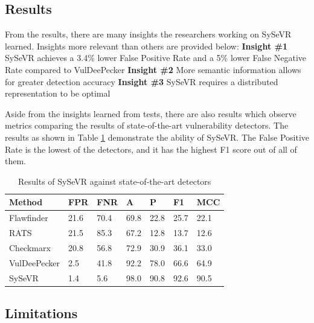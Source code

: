 \documentclass[12pt,twocolumn,letterpaper]{article}
\begin{document}
\subsection{Results}
\label{sub:results}
From the results, there are many insights the researchers working on SySeVR learned. Insights more relevant than others are
provided below:
\linebreak
\textbf{Insight \#1} SySeVR achieves a 3.4\% lower False Positive Rate and a 5\% lower False Negative Rate compared to VulDeePecker
\linebreak
\textbf{Insight \#2} More semantic information allows for greater detection accuracy
\linebreak
\textbf{Insight \#3} SySeVR requires a distributed representation to be optimal

Aside from the insights learned from tests, there are also results which observe metrics comparing the results 
of state-of-the-art vulnerability detectors. The results as shown in Table \ref{tab:sys} demonstrate the ability of SySeVR.
The False Positive Rate is the lowest of the detectors, and it has the highest F1 score out of all of them.

\begin{table}[]
\begin{tabular}{lllllll}
\hline
Method       & FPR  & FNR  & A    & P    & F1   & MCC  \\ \hline
Flawfinder   & 21.6 & 70.4 & 69.8 & 22.8 & 25.7 & 22.1 \\
RATS         & 21.5 & 85.3 & 67.2 & 12.8 & 13.7 & 12.6 \\
Checkmarx    & 20.8 & 56.8 & 72.9 & 30.9 & 36.1 & 33.0 \\
VulDeePecker & 2.5  & 41.8 & 92.2 & 78.0 & 66.6 & 64.9 \\
SySeVR       & 1.4  & 5.6  & 98.0 & 90.8 & 92.6 & 90.5 \\ \hline
\end{tabular}
\caption{Results of SySeVR against state-of-the-art detectors}
\label{tab:sys}
\end{table}

\subsection{Limitations}
\label{sub:limitations}
\end{document}
